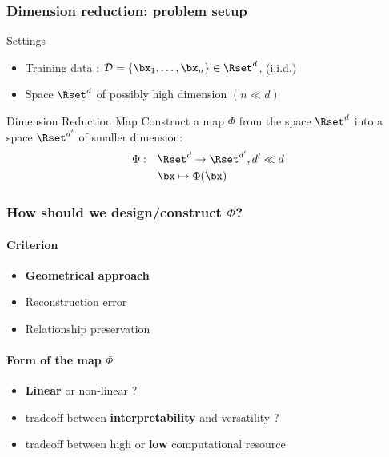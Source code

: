 \documentclass{beamer}\usepackage[]{graphicx}\usepackage[]{color}
\begin{document}
\begin{frame}
  \frametitle{Dimension reduction: problem setup}

    \begin{block}{Settings}
      \begin{itemize}
        \item \alert{Training data } : $\mathcal{D}=\{\bx_1,\ldots,\bx_n\} \in \Rset^d$,   (i.i.d.)
        \item Space $\Rset^d$ of possibly high dimension $(n \ll d)$
      \end{itemize}
    \end{block}

    \vfill
    
    \begin{block}{Dimension Reduction Map}
       Construct a map $\Phi$ from the space $\Rset^{d}$ into a space $\Rset^{d'}$ of \alert{smaller dimension}:
      \begin{align*}
          \Phi:\quad & \Rset^d \to \Rset^{d'}, d' \ll d\\
                     & \bx \mapsto \Phi(\bx)
      \end{align*}
    \end{block}
    
\end{frame}
 
\begin{frame}
  \frametitle{How should we design/construct $\Phi$?}

  \paragraph{Criterion}
  \begin{itemize}
    \item \alert{\bf Geometrical approach}
    \item Reconstruction error
    \item Relationship preservation
  \end{itemize}

  \vfill
  
  \paragraph{Form of the map $\Phi$}
  \begin{itemize}
    \item \alert{\bf Linear} or non-linear ?
    \item tradeoff between \alert{\bf interpretability} and versatility ?
    \item tradeoff between high or \alert{\bf low} computational resource
  \end{itemize}

\end{frame}
\end{document}
